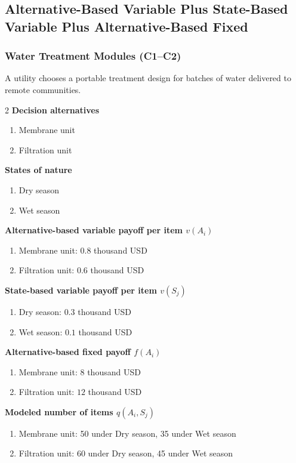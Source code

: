 \subsection{Alternative-Based Variable Plus State-Based Variable Plus Alternative-Based Fixed}
	\label{sec:alternative-based-variable-payoff-plus-state-based-variable-payoff-plus-alternative-based-fixed-payoff}


	\subsubsection{Water Treatment Modules (C1--C2)}
	\label{sec:problem26-water-treatment-modules-c1-c2}
	A utility chooses a portable treatment design for batches of water delivered to remote communities.
	\begin{multicols}{2}
	\textbf{Decision alternatives}
	\begin{enumerate}[label=\arabic*.]
\item Membrane unit
\item Filtration unit
	\end{enumerate}
	\textbf{States of nature}
	\begin{enumerate}[label=\arabic*.]
\item Dry season
\item Wet season
	\end{enumerate}
	\columnbreak
	\textbf{Alternative-based variable payoff per item $v(A_i)$}
\begin{enumerate}[label=\arabic*.]
\item Membrane unit: $0.8$ thousand USD
\item Filtration unit: $0.6$ thousand USD\end{enumerate}
\textbf{State-based variable payoff per item $v(S_j)$}
\begin{enumerate}[label=\arabic*.]
\item Dry season: $0.3$ thousand USD
\item Wet season: $0.1$ thousand USD\end{enumerate}
\textbf{Alternative-based fixed payoff $f(A_i)$}
\begin{enumerate}[label=\arabic*.]
\item Membrane unit: $8$ thousand USD
\item Filtration unit: $12$ thousand USD\end{enumerate}
\textbf{Modeled number of items $q(A_i,S_j)$}
\begin{enumerate}[label=\arabic*.]
\item Membrane unit: 50 under Dry season, 35 under Wet season
\item Filtration unit: 60 under Dry season, 45 under Wet season
\end{enumerate}
	\end{multicols}

